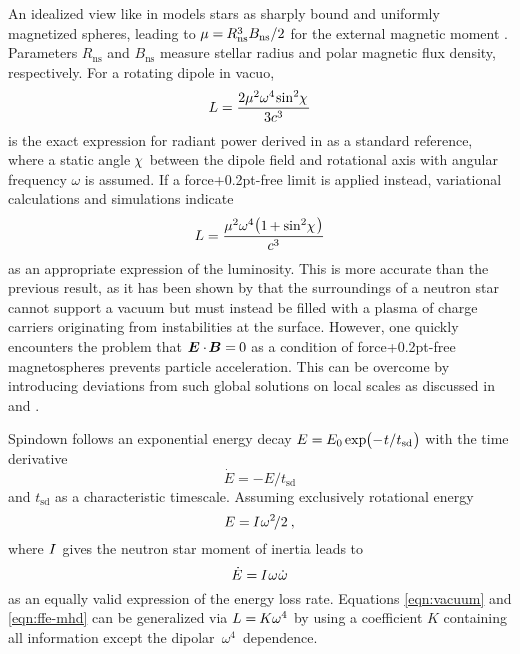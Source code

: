 An idealized view like in \cite{Deutsch_1955} models stars as sharply bound and uniformly magnetized spheres, leading to
$\cramped{\mu \kern-0.1pt = \kern-0.6pt R_\text{ns}^3 B_\text{ns} \kern+0.1pt / 2}$ for the external magnetic moment \cite{Jackson_1999}.
Parameters $R_\text{ns}$ and $B_\text{ns}$ measure stellar radius and polar magnetic flux density, respectively. For a rotating
dipole in vacuo,
\begin{equation}
	L = \frac{2\mu^2 \omega^4 \kern-1.0pt \sin^2 \kern-2.0pt \chi \kern+1.0pt}{3c^3}
	\label{eqn:vacuum}
\end{equation}
is the exact expression for radiant power derived in \cite{Jackson_1999} as a standard reference, where a static angle
$\kern-1.0pt \chi \kern+1.0pt$ between the dipole field and rotational axis with angular frequency $\omega$ is assumed. If
a force{\kern+0.2pt}-free limit is applied instead, variational calculations \cite{Gruzinov_2006} and simulations
\cite{Spitkovsky_2006} indicate
\begin{equation}
	L = \frac{\mu^2 \omega^4 \raisebox{0.15ex}{\( \bigl(
	\raisebox{-0.15ex}{\( 1 \kern-0.7pt + \sin^2 \kern-2.0pt \chi \kern+1.0pt \)} \bigr) \)} }{c^3}
	\label{eqn:ffe-mhd}
\end{equation}
as an appropriate expression of the luminosity. This is more accurate than the previous result, as it has been
shown by \cite{Goldreich_1969} that the surroundings of a neutron star cannot support a vacuum but must instead be filled
with a plasma of charge carriers originating from instabilities at the surface. However, one quickly encounters the problem that
$\bm{E} \cdot \kern-1.0pt \bm{B} = \kern-0.5pt 0$ as a condition of force{\kern+0.2pt}-free magnetospheres prevents particle acceleration.
This can be overcome by introducing deviations from such global solutions on local scales as discussed in \cite{Li_2012} and \cite{Gralla_2019}.

Spindown follows an exponential energy decay $E = \kern-0.3pt E_0 \kern-0.2pt \exp \kern-2.0pt
\smash{\bigl( - \kern+0.5pt t \kern+0.1pt / \kern+0.2pt t_\text{sd} \kern+0.5pt \bigr)}$ with the time derivative
\begin{equation}
	\dot{E} = - E / t_\text{sd}
	\label{eqn:exp-derivative}
\end{equation}
and $t_\text{sd}$ as a characteristic timescale. Assuming exclusively rotational energy
\begin{equation}
	E = \kern-0.5pt I \kern+0.5pt \omega^2 \kern-1.5pt / 2 \: ,
	\label{eqn:quad}
\end{equation}
where $I \kern+0.5pt$ gives the neutron star moment of inertia leads to
\begin{equation}
	\dot{E} = \kern-0.5pt I \kern+0.5pt \omega \kern+0.5pt \dot{\omega}
	\label{eqn:quad-derivative}
\end{equation}
as an equally valid expression of the energy loss rate. Equations \eqref{eqn:vacuum} and \eqref{eqn:ffe-mhd} can be generalized via
$L = \kern-0.5pt K \omega^4$ by using a coefficient $K$ containing all information except the \mbox{dipolar $\omega^4$ dependence.}

